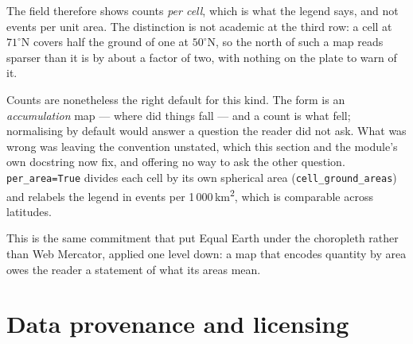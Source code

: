 \documentclass[11pt]{article}
\begin{document}
The field therefore shows counts \emph{per cell}, which is what the legend
says, and not events per unit area. The distinction is not academic at the
third row: a cell at $71^\circ$N covers half the ground of one at
$50^\circ$N, so the north of such a map reads sparser than it is by about
a factor of two, with nothing on the plate to warn of it.

Counts are nonetheless the right default for this kind. The form is an
\emph{accumulation} map --- where did things fall --- and a count is what
fell; normalising by default would answer a question the reader did not
ask. What was wrong was leaving the convention unstated, which this
section and the module's own docstring now fix, and offering no way to ask
the other question. \texttt{per\_area=True} divides each cell by its own
spherical area (\texttt{cell\_ground\_areas}) and relabels the legend in
events per 1\,000\,km\textsuperscript{2}, which is comparable across
latitudes.

This is the same commitment that put Equal Earth under the choropleth
rather than Web Mercator, applied one level down: a map that encodes
quantity by area owes the reader a statement of what its areas mean.

\clearpage
\section{Data provenance and licensing}
\end{document}
